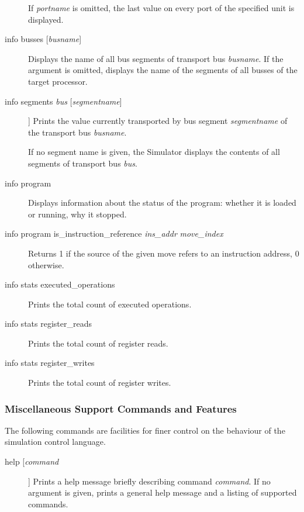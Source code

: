 \documentclass[a4paper,twoside]{tceusermanual}
\begin{document}
\begin{description}
  If \emph{portname} is omitted, the last value on every port of the
  specified unit is displayed.

\item[info busses {[\emph{busname}]}] %
  Displays the name of all bus segments of transport bus \emph{busname}.  If
  the argument is omitted, displays the name of the segments of all busses
  of the target processor.%

\item[info segments \emph{bus} {[\emph{segmentname}]}]] %
  Prints the value currently transported by bus segment \emph{segmentname}
  of the transport bus \emph{busname}.

  If no segment name is given, the Simulator displays the contents of all
  segments of transport bus \emph{bus}.

\item[info program] %
  Displays information about the status of the program: whether it is
  loaded or running, why it stopped.

\item[info program is\_instruction\_reference \emph{ins\_addr} \emph{move\_index}]
  Returns 1 if the source of the given move refers to an instruction
  address, 0 otherwise.

\item[info stats executed\_operations] %
  Prints the total count of executed operations.

\item[info stats register\_reads] %
  Prints the total count of register reads.

\item[info stats register\_writes] %
  Prints the total count of register writes.

\end{description}

\subsubsection{Miscellaneous Support Commands and Features}
\label{ssec:debug-misc}

The following commands are facilities for finer control on the behaviour of
the simulation control language.

\begin{description}
\item[help [\emph{command}]] %
  Prints a help message briefly describing command \emph{command}.
 If no argument is given, prints a general help message and a listing of
 supported commands.
\end{description}
\end{document}
